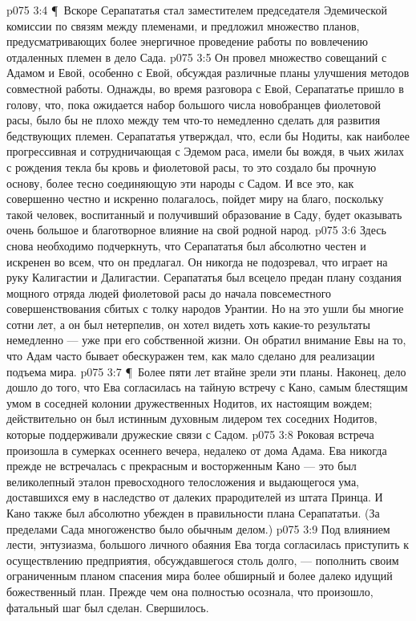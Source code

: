 \vs p075 3:4 \P\ Вскоре Серапататья стал заместителем председателя Эдемической комиссии по связям между племенами, и предложил множество планов, предусматривающих более энергичное проведение работы по вовлечению отдаленных племен в дело Сада.
\vs p075 3:5 Он провел множество совещаний с Адамом и Евой, особенно с Евой, обсуждая различные планы улучшения методов совместной работы. Однажды, во время разговора с Евой, Серапататье пришло в голову, что, пока ожидается набор большого числа новобранцев фиолетовой расы, было бы не плохо между тем что\hyp{}то немедленно сделать для развития бедствующих племен. Серапататья утверждал, что, если бы Нодиты, как наиболее прогрессивная и сотрудничающая с Эдемом раса, имели бы вождя, в чьих жилах с рождения текла бы кровь и фиолетовой расы, то это создало бы прочную основу, более тесно соединяющую эти народы с Садом. И все это, как совершенно честно и искренно полагалось, пойдет миру на благо, поскольку такой человек, воспитанный и получивший образование в Саду, будет оказывать очень большое и благотворное влияние на свой родной народ.
\vs p075 3:6 Здесь снова необходимо подчеркнуть, что Серапататья был абсолютно честен и искренен во всем, что он предлагал. Он никогда не подозревал, что играет на руку Калигастии и Далигастии. Серапататья был всецело предан плану создания мощного отряда людей фиолетовой расы до начала повсеместного совершенствования сбитых с толку народов Урантии. Но на это ушли бы многие сотни лет, а он был нетерпелив, он хотел видеть хоть какие\hyp{}то результаты немедленно --- уже при его собственной жизни. Он обратил внимание Евы на то, что Адам часто бывает обескуражен тем, как мало сделано для реализации подъема мира.
\vs p075 3:7 \P\ Более пяти лет втайне зрели эти планы. Наконец, дело дошло до того, что Ева согласилась на тайную встречу с Кано, самым блестящим умом в соседней колонии дружественных Нодитов, их настоящим вождем; действительно он был истинным духовным лидером тех соседних Нодитов, которые поддерживали дружеские связи с Садом.
\vs p075 3:8 Роковая встреча произошла в сумерках осеннего вечера, недалеко от дома Адама. Ева никогда прежде не встречалась с прекрасным и восторженным Кано --- это был великолепный эталон превосходного телосложения и выдающегося ума, доставшихся ему в наследство от далеких прародителей из штата Принца. И Кано также был абсолютно убежден в правильности плана Серапататьи. (За пределами Сада многоженство было обычным делом.)
\vs p075 3:9 Под влиянием лести, энтузиазма, большого личного обаяния Ева тогда согласилась приступить к осуществлению предприятия, обсуждавшегося столь долго, --- пополнить своим ограниченным планом спасения мира более обширный и более далеко идущий божественный план. Прежде чем она полностью осознала, что произошло, фатальный шаг был сделан. Свершилось.
